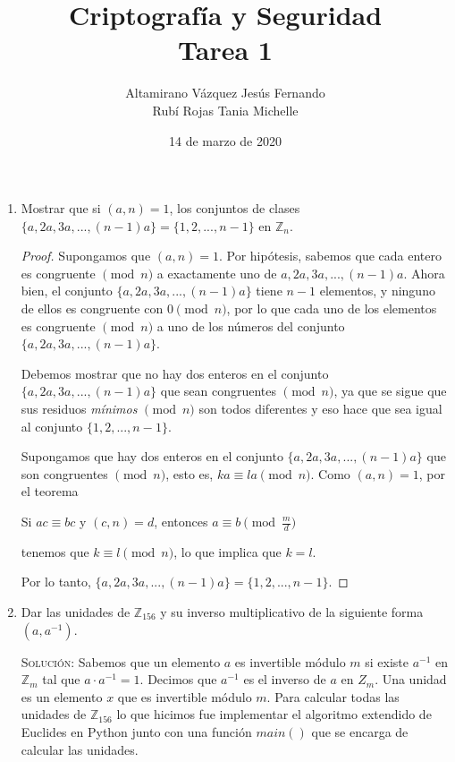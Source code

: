 \documentclass[letterpaper,10pt]{article}
\title{Criptografía y Seguridad \\ Tarea 1}
\author{Altamirano Vázquez Jesús Fernando \\
        Rubí Rojas Tania Michelle}
\date{14 de marzo de 2020}
\begin{document}
\maketitle

\begin{enumerate}
    \item Mostrar que si $(a, n) = 1$, los conjuntos de clases 
    $\{a,2a,3a,...,(n-1)a\} = \{1,2,...,n-1\}$ en $\mathbb{Z}_{n}$.
    \begin{proof}
        Supongamos que $(a, n) = 1$. Por hipótesis, sabemos que cada entero es
        congruente $\pmod{n}$ a exactamente uno de $a, 2a, 3a, ..., (n-1)a$.
        Ahora bien, el conjunto $\{a,2a,3a,...,(n-1)a\}$ tiene $n-1$ elementos,
        y ninguno de ellos es congruente con $0 \pmod{n}$, por lo que cada uno
        de los elementos es congruente $\pmod{n}$ a uno de los números del
        conjunto $\{a,2a,3a,...,(n-1)a\}$. 
        
        Debemos mostrar que no hay dos enteros en el conjunto 
        $\{a,2a,3a,...,(n-1)a\}$ que sean congruentes $\pmod{n}$, ya que se
        sigue que sus residuos \textit{mínimos} $\pmod{n}$ son todos diferentes 
        y eso hace que sea igual al conjunto $\{1,2,...,n-1\}$. 
        
        Supongamos que hay dos enteros en el conjunto $\{a,2a,3a,...,(n-1)a\}$ 
        que son congruentes $\pmod{n}$, esto es, $ka \equiv la \pmod{n}$. Como
        $(a, n) = 1$, por el teorema 
        \begin{center}
            Si $ac \equiv bc$ y $(c,n) = d$, entonces $a \equiv b 
            \pmod{\frac{m}{d}}$
        \end{center}
        
        tenemos que $k \equiv l \pmod{n}$, lo que implica que $k = l$.
        
        Por lo tanto, $\{a,2a,3a,...,(n-1)a\} = \{1,2,...,n-1\}$.
    \end{proof}

    
    \item Dar las unidades de $\mathbb{Z}_{156}$ y su inverso multiplicativo de
    la siguiente forma $(a, a^{-1})$.
    
    \textsc{Solución:} Sabemos que un elemento $a$ es invertible módulo $m$ si
    existe $a^{-1}$ en $\mathbb{Z}_{m}$ tal que $a \cdot a^{-1} = 1$. Decimos
    que $a^{-1}$ es el inverso de $a$ en $Z_{m}$. Una unidad es un elemento
    $x$ que es invertible módulo $m$. Para calcular todas las unidades de 
    $\mathbb{Z}_{156}$ lo que hicimos fue implementar el algoritmo extendido de
    Euclides en Python junto con una función $main()$ que se encarga de 
    calcular las unidades.
    

\end{enumerate}
\end{document}
